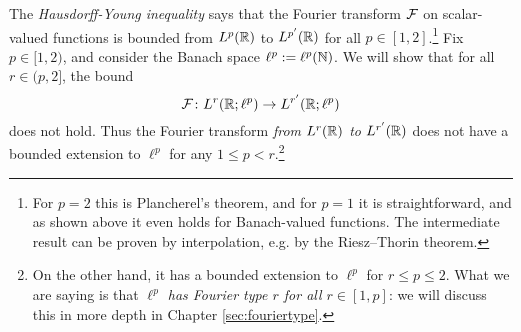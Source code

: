 \begin{example}
  The \emph{Hausdorff-Young inequality} says that the Fourier transform $\mathcal{F}$ on scalar-valued functions is bounded from $L^p(\mathbb{R})$ to $L^{p'}(\mathbb{R})$ for all $p \in [1,2]$.\footnote{For $p=2$ this is Plancherel's theorem, and for $p=1$ it is straightforward, and as shown above it even holds for Banach-valued functions. The intermediate result can be proven by interpolation, e.g. by the Riesz--Thorin theorem.}
  Fix $p \in [1,2)$, and consider the Banach space $\ell^p := \ell^{p}(\mathbb{N})$.
  We will show that for all $r \in (p,2]$, the bound
  \begin{equation}\label{eq:FT-bound-lp}
    \mathcal{F} \colon L^r(\mathbb{R};\ell^p) \rightarrow L^{r'}(\mathbb{R};\ell^p)
  \end{equation}
  does not hold.
  Thus the Fourier transform \emph{from $L^r(\mathbb{R})$ to $L^{r'}(\mathbb{R})$} does not have a bounded extension to $\ell^p$ for any $1 \leq p < r$.\footnote{On the other hand, it has a bounded extension to $\ell^p$ for $r \leq p \leq 2$. What we are saying is that \emph{$\ell^p$ has Fourier type $r$ for all $r \in [1,p]$}: we will discuss this in more depth in Chapter \ref{sec:fouriertype}.}


\end{example}
